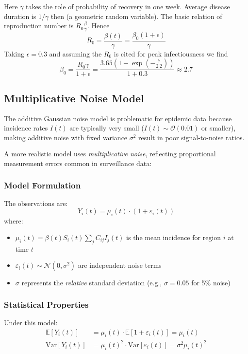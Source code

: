 Here $\gamma$ takes the role of probability of recovery in one
week. Average disease duration is $1/ \gamma$ then (a geometric random
variable). The basic relation of reproduction number is $R_0
\frac{\beta}{\gamma}$. Hence
\begin{equation}
  R_0 = \frac{\beta(t)}{\gamma} = \frac{\beta_0 (1+\epsilon)}{\gamma}
\end{equation}
Taking $\epsilon = 0.3$ and assuming the $R_0$ is cited for peak infectiousness we find
$$
\beta_0 = \frac{R_0 \gamma}{1+\epsilon} = \frac{3.65 (1-\exp\left (-\frac{7}{2.2} \right))}{1+0.3} \approx 2.7
$$

\subsection{Multiplicative Noise Model}

The additive Gaussian noise model is problematic for epidemic data because incidence rates $I(t)$ are typically very small ($I(t) \sim \mathcal{O}(0.01)$ or smaller), making additive noise with fixed variance $\sigma^2$ result in poor signal-to-noise ratios.

A more realistic model uses \emph{multiplicative noise}, reflecting proportional measurement errors common in surveillance data:

\subsubsection{Model Formulation}

The observations are:
\begin{equation}
Y_i(t) = \mu_i(t) \cdot (1 + \varepsilon_i(t))
\end{equation}
where:
\begin{itemize}
\item $\mu_i(t) = \beta(t) S_i(t) \sum_j C_{ij} I_j(t)$ is the mean incidence for region $i$ at time $t$
\item $\varepsilon_i(t) \sim \mathcal{N}(0, \sigma^2)$ are independent noise terms
\item $\sigma$ represents the \emph{relative} standard deviation (e.g., $\sigma = 0.05$ for 5\% noise)
\end{itemize}

\subsubsection{Statistical Properties}

Under this model:
\begin{align}
\mathbb{E}[Y_i(t)] &= \mu_i(t) \cdot \mathbb{E}[1 + \varepsilon_i(t)] = \mu_i(t) \\
\text{Var}[Y_i(t)] &= \mu_i(t)^2 \cdot \text{Var}[\varepsilon_i(t)] = \sigma^2 \mu_i(t)^2
\end{align}

